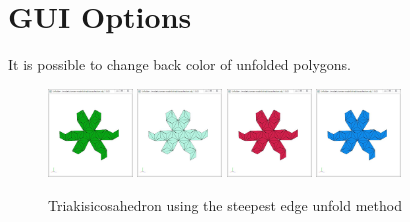 \documentclass[11pt, letterpaper]{article}
\begin{document}
\section{GUI Options}
It is possible to change back color of unfolded polygons.
\begin{figure}[th]
\centering
\includegraphics[width=0.2\textwidth]{FIGS/triakisicosahedron_s-wi-green.jpg}
\hspace{5mm}
\includegraphics[width=0.2\textwidth]{FIGS/triakisicosahedron_s-wi-mint.jpg}
\hspace{5mm}
\includegraphics[width=0.2\textwidth]{FIGS/triakisicosahedron_s-wi-ppink.jpg}
\hspace{5mm}
\includegraphics[width=0.2\textwidth]{FIGS/triakisicosahedron_s-wi-skyblue.jpg}
\caption{Triakisicosahedron using the steepest edge unfold method}
\end{figure}
\end{document}
